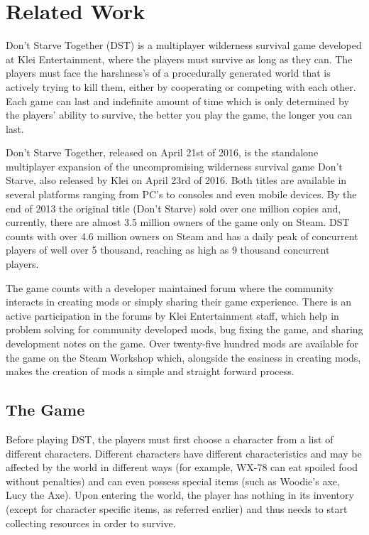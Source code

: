 \section{Related Work}
Don’t Starve Together (DST) is a multiplayer wilderness survival game developed at Klei Entertainment, where the players must survive as long as they can.
The players must face the harshness’s of a procedurally generated world that is actively trying to kill them, either by cooperating or competing with each other.
Each game can last and indefinite amount of time which is only determined by the players’ ability to survive, the better you play the game, the longer you can last.

Don’t Starve Together, released on April 21st of 2016, is the standalone multiplayer expansion of the uncompromising wilderness survival game Don’t Starve, also released by Klei on April 23rd of 2016.
Both titles are available in several platforms ranging from PC’s to consoles and even mobile devices.
By the end of 2013 the original title (Don’t Starve) sold over one million copies and, currently, there are almost 3.5 million owners of the game only on Steam.
DST counts with over 4.6 million owners on Steam and has a daily peak of concurrent players of well over 5 thousand, reaching as high as 9 thousand concurrent players.

The game counts with a developer maintained forum where the community interacts in creating mods or simply sharing their game experience.
There is an active participation in the forums by Klei Entertainment staff, which help in problem solving for community developed mods, bug fixing the game, and sharing development notes on the game.
Over twenty-five hundred mods are available for the game on the Steam Workshop which, alongside the easiness in creating mods, makes the creation of mods a simple and straight forward process.

\subsection*{The Game}
Before playing DST, the players must first choose a character from a list of different characters.
Different characters have different characteristics and may be affected by the world in different ways (for example, WX-78 can eat spoiled food without penalties) and can even possess special items (such as Woodie’s axe, Lucy the Axe).
Upon entering the world, the player has nothing in its inventory (except for character specific items, as referred earlier) and thus needs to start collecting resources in order to survive.

